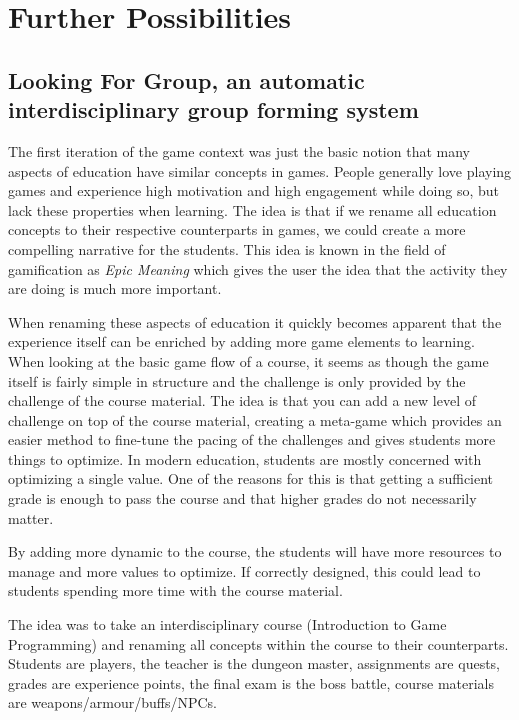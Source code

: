 \documentclass[11pt]{article}
\begin{document}
\pagebreak



\pagebreak
\appendix
\section{Further Possibilities}
\subsection{Looking For Group, an automatic interdisciplinary group forming system}
The first iteration of the game context was just the basic notion that many aspects of education have similar concepts in games. People generally love playing games and experience high motivation and high engagement while doing so, but lack these properties when learning. The idea is that if we rename all education concepts to their respective counterparts in games, we could create a more compelling narrative for the students. This idea is known in the field of gamification as \emph{Epic Meaning} which gives the user the idea that the activity they are doing is much more important. 

When renaming these aspects of education it quickly becomes apparent that the experience itself can be enriched by adding more game elements to learning. When looking at the basic game flow of a course, it seems as though the game itself is fairly simple in structure and the challenge is only provided by the challenge of the course material. The idea is that you can add a new level of challenge on top of the course material, creating a meta-game which provides an easier method to fine-tune the pacing of the challenges and gives students more things to optimize. In modern education, students are mostly concerned with optimizing a single value. One of the reasons for this is that getting a sufficient grade is enough to pass the course and that higher grades do not necessarily matter. 

By adding more dynamic to the course, the students will have more resources to manage and more values to optimize. If correctly designed, this could lead to students spending more time with the course material. 

The idea was to take an interdisciplinary course (Introduction to Game Programming) and renaming all concepts within the course to their counterparts. Students are players, the teacher is the dungeon master, assignments are quests, grades are experience points, the final exam is the boss battle, course materials are weapons/armour/buffs/NPCs.
\end{document}
